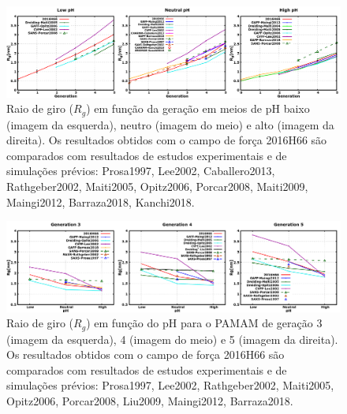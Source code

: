 \begin{figure}[ht!]
\centering
\includegraphics[width=\textwidth]{images/PME/PAMAMRg.png}
\caption{Raio de giro ($R_g$) em função da geração em meios de pH baixo (imagem da esquerda), neutro (imagem do meio) e alto (imagem da direita).
Os resultados obtidos com o campo de força 2016H66\cite{Horta2016} são comparados com resultados de estudos experimentais e de simulações prévios:
Prosa1997\cite{Prosa1997}, %
Lee2002\cite{Lee2002}, %
Caballero2013\cite{Caballero2013}, %
Rathgeber2002\cite{Rathgeber2002}, %
Maiti2005\cite{Maiti2005}, %
Opitz2006\cite{Opitz2006}, %
Porcar2008\cite{Porcar2008}, %
Maiti2009\cite{Maiti2009}, %
Maingi2012\cite{Maingi2012}, %
Barraza2018\cite{Barraza2018}, %
Kanchi2018\cite{Kanchi2018}.} %
\label{supfig:PAMAMRg}
\end{figure}

\begin{figure}[ht!]
\centering
\includegraphics[width=\textwidth]{images/PME/PAMAMgyrateGpH.png}
\caption{Raio de giro ($R_g$) em função do pH para o PAMAM de geração 3 (imagem da esquerda), 4 (imagem do meio) e 5 (imagem da direita).
Os resultados obtidos com o campo de força 2016H66\cite{Horta2016} são comparados com resultados de estudos experimentais e de simulações prévios:
Prosa1997\cite{Prosa1997}, %
Lee2002\cite{Lee2002}, %
Rathgeber2002\cite{Rathgeber2002}, %
Maiti2005\cite{Maiti2005}, %
Opitz2006\cite{Opitz2006}, %
Porcar2008\cite{Porcar2008}, %
Liu2009\cite{Liu2009}, %
Maingi2012\cite{Maingi2012}, %
Barraza2018\cite{Barraza2018}.} %
\label{supfig:PAMAMRgpH}   
\end{figure}

